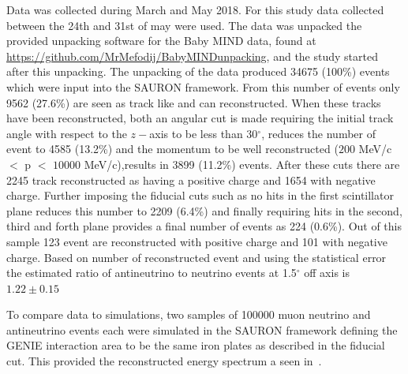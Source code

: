 



Data was collected during March and May 2018. For this study data collected between the 24th and 31st of may were used. The data was unpacked the provided unpacking software for the Baby MIND data, found at \url{https://github.com/MrMefodij/BabyMINDunpacking}, and the study started after this unpacking. The unpacking of the data produced 34675 (100\%) events which were input into the SAURON framework. From this number of events only 9562 (27.6\%) are seen as track like and can reconstructed. When these tracks have been reconstructed, both an angular cut is made requiring the initial track angle with respect to the $z-$axis to be less than 30$^\circ$, reduces the number of event to 4585 (13.2\%) and the momentum to be well reconstructed ($ 200$ MeV/c $<$ p $<$ $10000$ MeV/c),results in 3899 (11.2\%) events. After these cuts there are 2245 track reconstructed as having a positive charge and 1654 with negative charge. Further imposing the fiducial cuts such as no hits in the first scintillator plane reduces this number to 2209 (6.4\%) and finally requiring hits in the second, third and forth plane provides a final number of events as 224 (0.6\%). Out of this sample 123 event are reconstructed with positive charge and 101 with negative charge. Based on number of reconstructed event and using the statistical error the estimated ratio of antineutrino to neutrino events at 1.5$^\circ$ off axis is $1.22 \pm 0.15$ 

To compare data to simulations, two samples of 100000 muon neutrino and antineutrino events each were simulated in the SAURON framework defining the GENIE interaction area to be the same iron plates as described in the fiducial cut. This provided the reconstructed energy spectrum a seen in~.

